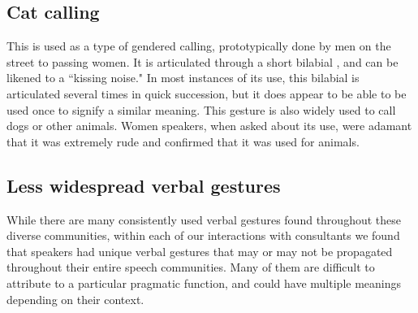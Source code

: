 \documentclass[output=paper
,newtxmath
,modfonts
,nonflat]{langsci/langscibook}
\begin{document}
\subsection{Cat calling}

This  is used as a type of gendered calling, prototypically done by men on the street to passing women. It is articulated through a short bilabial , and can be likened to a ``kissing noise." In most instances of its use, this bilabial  is articulated several times in quick succession, but it does appear to be able to be used once to signify a similar meaning. This gesture is also widely used to call dogs or other animals. Women speakers, when asked about its use, were adamant that it was extremely rude and confirmed that it was used for animals. 





\subsection{Less widespread verbal gestures}\label{sec:pillion:less}
While there are many consistently used verbal gestures found throughout these diverse communities, within each of our interactions with consultants we found that speakers had unique verbal gestures that may or may not be propagated throughout their entire speech communities. Many of them are difficult to attribute to a particular pragmatic function, and could have multiple meanings depending on their context. 
\end{document}
